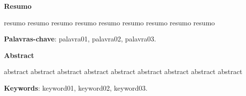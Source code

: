 \begin{center}
    {\bf Resumo}
\end{center}

resumo resumo resumo
resumo resumo resumo
resumo resumo resumo

\vspace{2cm}
\textbf{Palavras-chave}:
palavra01, palavra02, palavra03.

\clearpage
\begin{center}
    {\bf Abstract}
\end{center}

abstract abstract abstract
abstract abstract abstract
abstract abstract abstract

\vspace{2cm}
\textbf{Keywords}:
keyword01, keyword02, keyword03.
